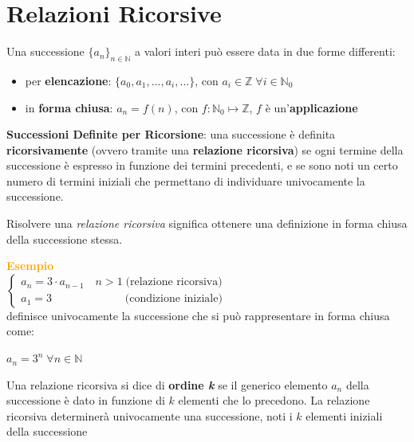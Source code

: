 \chapter{Relazioni Ricorsive}

\begin{flushleft}
    Una successione $\{a_n\}_{n \in \mathbb{N}}$ a valori interi può essere data in due forme differenti:
    \begin{itemize}[nosep]
        \item per \textbf{elencazione}: $\{a_0, a_1, ..., a_i, ...\}$, con $a_i \in \mathbb{Z} \; \forall i \in \mathbb{N}_0$
        \item in \textbf{forma chiusa}: $a_n = f(n)$, con $f : \mathbb{N}_0 \mapsto \mathbb{Z}$, $f$ è un'\textbf{applicazione}
    \end{itemize}

    \textbf{Successioni Definite per Ricorsione}: una successione è definita \textbf{ricorsivamente} (ovvero tramite una \textbf{relazione ricorsiva}) se ogni termine della successione è espresso in funzione dei termini precedenti, e se sono noti un certo numero di termini iniziali che permettano di individuare univocamente la successione.

    Risolvere una \textit{relazione ricorsiva} significa ottenere una definizione in forma chiusa della successione stessa.

    \begin{boxA}
        \textcolor{orange}{\textbf{Esempio}} \\
        $\begin{cases}
            a_n = 3 \cdot a_{n - 1} \quad n > 1 \; \text{(relazione ricorsiva)} \\
            a_1 = 3 \qquad \qquad \qquad \;\; \text{(condizione iniziale)}
        \end{cases}$ \\
        definisce univocamente la successione  che si può rappresentare in forma chiusa come:

        {\centering
            $a_n = 3^n \; \forall n \in \mathbb{N}$
        \par}
    \end{boxA}

    Una relazione ricorsiva si dice di \textbf{ordine \textit{k}} se il generico elemento $a_n$ della successione è dato in funzione di $k$ elementi che lo precedono. La relazione ricorsiva determinerà univocamente una successione, noti i $k$ elementi iniziali della successione


\end{flushleft}
